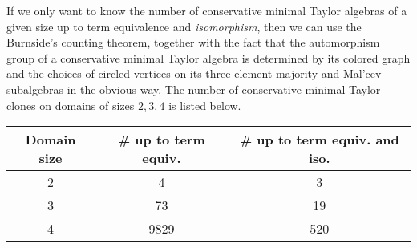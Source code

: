 If we only want to know the number of conservative minimal Taylor algebras of a given size up to term equivalence and \emph{isomorphism}, then we can use the Burnside's counting theorem, together with the fact that the automorphism group of a conservative minimal Taylor algebra is determined by its colored graph and the choices of circled vertices on its three-element majority and Mal'cev subalgebras in the obvious way. The number of conservative minimal Taylor clones on domains of sizes $2,3,4$ is listed below.
\begin{center}
\begin{tabular}{c|c|c}
Domain size & \# up to term equiv. & \# up to term equiv. and iso. \\
\hline
2 & 4 & 3\\
3 & 73 & 19\\
4 & 9829 & 520
\end{tabular}
\end{center}


